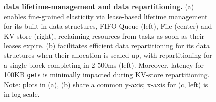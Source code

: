 \begin{figure}[t]
  \centering
  \caption[\jiffy data lifetime-management and data repartitioning]{\textbf{\jiffy data lifetime-management and data repartitioning.} (a) \jiffy enables fine-grained elasticity via lease-based lifetime management for its built-in data structures, FIFO Queue (left), File (center) and KV-store (right), reclaiming resources from tasks as soon as their leases expire. (b) \jiffy facilitates efficient data repartitioning for its data structures when their allocation is scaled up, with repartitioning for a single block completing in $2$-$500$ms (left). Moreover, \jiffy latency for 100KB \texttt{get}s is minimally impacted during KV-store repartitioning. Note: plots in (a), (b) share a common y-axis; x-axis for (c, left) is in log-scale.}
\end{figure}




